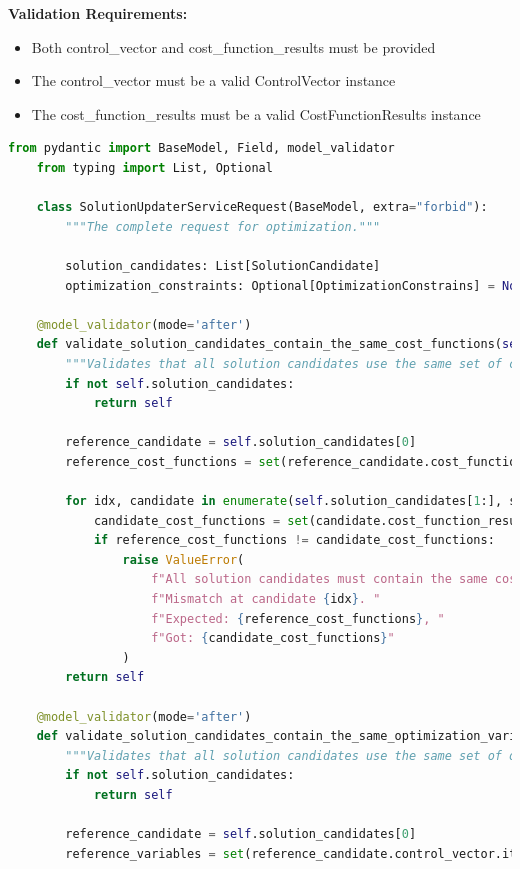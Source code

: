 \textbf{Validation Requirements:}
\begin{itemize}
	\item Both control\_vector and cost\_function\_results must be provided
	\item The control\_vector must be a valid ControlVector instance
	\item The cost\_function\_results must be a valid CostFunctionResults instance
\end{itemize}

\begin{lstlisting}[language=Python, caption={SolutionUpdaterServiceRequest model with complex validation logic}]
	from pydantic import BaseModel, Field, model_validator
	from typing import List, Optional

	class SolutionUpdaterServiceRequest(BaseModel, extra="forbid"):
		"""The complete request for optimization."""

		solution_candidates: List[SolutionCandidate]
		optimization_constraints: Optional[OptimizationConstrains] = None

	@model_validator(mode='after')
	def validate_solution_candidates_contain_the_same_cost_functions(self) -> 'SolutionUpdaterServiceRequest':
		"""Validates that all solution candidates use the same set of cost functions."""
		if not self.solution_candidates:
			return self

		reference_candidate = self.solution_candidates[0]
		reference_cost_functions = set(reference_candidate.cost_function_results.values.keys())

		for idx, candidate in enumerate(self.solution_candidates[1:], start=1):
			candidate_cost_functions = set(candidate.cost_function_results.values.keys())
			if reference_cost_functions != candidate_cost_functions:
				raise ValueError(
					f"All solution candidates must contain the same cost functions. "
					f"Mismatch at candidate {idx}. "
					f"Expected: {reference_cost_functions}, "
					f"Got: {candidate_cost_functions}"
				)
		return self

	@model_validator(mode='after')
	def validate_solution_candidates_contain_the_same_optimization_variables(self) -> 'SolutionUpdaterServiceRequest':
		"""Validates that all solution candidates use the same set of optimization variables."""
		if not self.solution_candidates:
			return self

		reference_candidate = self.solution_candidates[0]
		reference_variables = set(reference_candidate.control_vector.items.keys())


\end{lstlisting}
